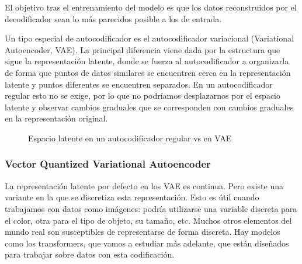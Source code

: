El objetivo tras el entrenamiento del modelo es que los datos reconstruidos por el decodificador sean lo más parecidos posible a los de entrada.

Un tipo especial de autocodificador es el autocodificador variacional (Variational Autoencoder, VAE). La principal diferencia viene dada por la estructura que sigue la representación latente, donde se fuerza al autocodificador a organizarla de forma que puntos de datos similares se encuentren cerca en la representación latente y puntos diferentes se encuentren separados. En un autocodificador regular esto no se exige, por lo que no podríamos desplazarnos por el espacio latente y observar cambios graduales que se corresponden con cambios graduales en la representación original. \cite{vqvae}

\begin{figure}[H]
\centering
    \caption{Espacio latente en un autocodificador regular vs en VAE \cite{vqvae}}
\end{figure}

\subsubsection{Vector Quantized Variational Autoencoder}
La representación latente por defecto en los VAE es continua. Pero existe una variante en la que se discretiza esta representación. Esto es útil cuando trabajamos con datos como imágenes: podría utilizarse una variable discreta para el color, otra para el tipo de objeto, su tamaño, etc. Muchos otros elementos del mundo real son susceptibles de representarse de forma discreta. Hay modelos como los transformers, que vamos a estudiar más adelante, que están diseñados para trabajar sobre datos con esta codificación.

